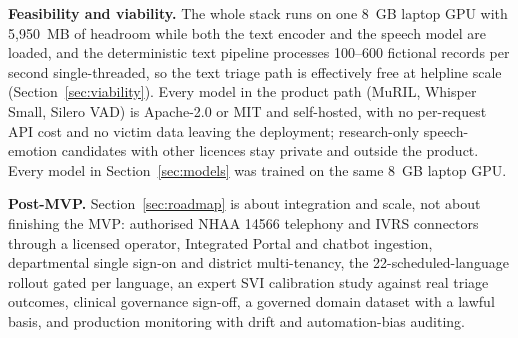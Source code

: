 \documentclass[11pt,a4paper]{article}
\begin{document}
\textbf{Feasibility and viability.} The whole stack runs on one 8~GB laptop GPU with 5{,}950~MB of
headroom while both the text encoder and the speech model are loaded, and the deterministic text
pipeline processes 100--600 fictional records per second single-threaded, so the text triage path is
effectively free at helpline scale (Section~\ref{sec:viability}). Every model in the product path
(MuRIL, Whisper Small, Silero VAD) is Apache-2.0 or MIT and self-hosted, with no per-request API cost
and no victim data leaving the deployment; research-only speech-emotion candidates with other licences
stay private and outside the product. Every model in Section~\ref{sec:models} was trained on the same
8~GB laptop GPU.

\textbf{Post-MVP.} Section~\ref{sec:roadmap} is about integration and scale, not about finishing the
MVP: authorised NHAA 14566 telephony and IVRS connectors through a licensed operator, Integrated
Portal and chatbot ingestion, departmental single sign-on and district multi-tenancy, the
22-scheduled-language rollout gated per language, an expert SVI calibration study against real
triage outcomes, clinical governance sign-off, a governed domain dataset with a lawful basis, and
production monitoring with drift and automation-bias auditing.
\end{document}
